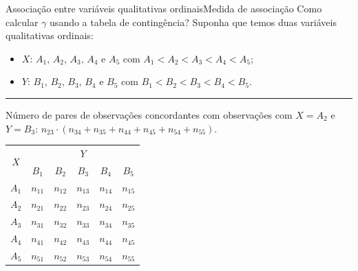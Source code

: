\documentclass[
  10pt,
  ignorenonframetext,
]{beamer}
\providecommand{\tightlist}{%
  \setlength{\itemsep}{0pt}\setlength{\parskip}{0pt}}\usepackage{longtable,booktabs,array}
\newcommand*{\regrafina}{\rule{\textwidth}{0.5pt}}
\begin{document}
\begin{frame}{Associação entre variáveis qualitativas
ordinais\newline Medida de associação}
\protect\hypertarget{associauxe7uxe3o-entre-variuxe1veis-qualitativas-ordinaismedida-de-associauxe7uxe3o-3}{}
Como calcular \(\gamma\) usando a tabela de contingência? Suponha que
temos duas variáveis qualitativas ordinais:

\begin{itemize}
\tightlist
\item
  \(X\): \(A_1\), \(A_2\), \(A_3\), \(A_4\) e \(A_5\) com
  \(A_1 < A_2 < A_3 < A_4 <A_5\);
\item
  \(Y\): \(B_1\), \(B_2\), \(B_3\), \(B_4\) e \(B_5\) com
  \(B_1 < B_2 < B_3 < B_4 <B_5\).
\end{itemize}

\regrafina

Número de pares de observações concordantes com observações com
\(X=A_2\) e \(Y=B_3\):
\(n_{23}\cdot (n_{34} + n_{35} + n_{44} + n_{45} + n_{54} + n_{55})\).

\begin{table}
\begin{tabular}{c|ccccc}
\toprule
\multicolumn{1}{c}{\multirow{2}{*}{$X$}} & \multicolumn{5}{c}{$Y$}  \\ \cmidrule{2-6}
\multicolumn{1}{c}{}                   & $B_1$ & $B_2$ & $B_3$ & $B_4$ & $B_5$ \\ \midrule
$A_1$                                     & $n_{11}$   &  $n_{12}$  & $n_{13}$   &  $n_{14}$  & $n_{15}$   \\
$A_2$                                     & $n_{21}$   &  $n_{22}$  & \cellcolor{gray} $n_{23}$   &  $n_{24}$  & $n_{25}$   \\
$A_3$                                     & $n_{31}$   &  $n_{32}$  & $n_{33}$   & \cellcolor{LimeGreen}  $n_{34}$  & \cellcolor{LimeGreen} $n_{35}$   \\
$A_4$                                     & $n_{41}$   &  $n_{42}$  & $n_{43}$   & \cellcolor{LimeGreen}  $n_{44}$  & \cellcolor{LimeGreen} $n_{45}$   \\
$A_5$                                     & $n_{51}$   &  $n_{52}$  & $n_{53}$   & \cellcolor{LimeGreen}  $n_{54}$  & \cellcolor{LimeGreen} $n_{55}$   \\
\bottomrule
\end{tabular}
\end{table}
\end{frame}
\end{document}
